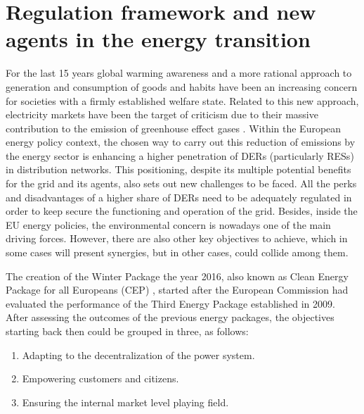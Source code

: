 \section{Regulation framework and new agents in the energy transition}
For the last 15 years global warming awareness and a more rational approach to generation and consumption of goods and habits have been an increasing concern for societies with a firmly established welfare state. Related to this new approach, electricity markets have been the target of criticism due to their massive contribution to the emission of greenhouse effect gases \cite{Hancher2017}. Within the European energy policy context, the chosen way to carry out this reduction of emissions by the energy sector is enhancing a higher penetration of DERs (particularly RESs) in distribution networks. This positioning, despite its multiple potential benefits for the grid and its agents, also sets out new challenges to be faced.
All the perks and disadvantages of a higher share of DERs need to be adequately regulated in order to keep secure the functioning and operation of the grid. Besides, inside the EU energy policies, the environmental concern is nowadays one of the main driving forces. However, there are also other key objectives to achieve, which in some cases will present synergies, but in other cases, could collide among them. 

The creation of the Winter Package the year 2016, also known as Clean Energy Package for all Europeans (CEP) \cite{validzic2017clean}, started after the European Commission had evaluated the performance of the Third Energy Package established in 2009.  After assessing the outcomes of the previous energy packages, the objectives starting back then could be grouped in three, as follows: 
\begin{enumerate}
\item Adapting to the decentralization of the power system. 
\item Empowering customers and citizens. 
\item Ensuring the internal market level playing field. 
\end{enumerate}

